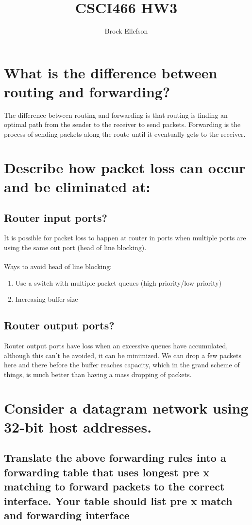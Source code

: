 \documentclass[10pt,letterpaper]{article}
\author{Brock Ellefson}
\title{CSCI466 HW3}
\begin{document}
\maketitle
\section{What is the difference between routing and forwarding?}
The difference between routing and forwarding is that routing is finding an optimal path from the sender to the receiver to send packets. Forwarding is the process of sending packets along the route until it eventually gets to the receiver. 

\section{Describe how packet loss can occur and be eliminated at:}
\subsection{Router input ports?}
It is possible for packet loss to happen at router in ports when multiple ports are using the same out port (head of line blocking).
\\ \\
Ways to avoid head of line blocking:
\begin{enumerate}
  \item Use a switch with multiple packet queues (high priority/low priority) 
  \item Increasing buffer size 
\end{enumerate}

\subsection{Router output ports?}
Router output ports have loss when an excessive queues have  
accumulated, although this can't be avoided, it can be minimized. We can drop a few packets here and there before the buffer reaches capacity, which in the grand scheme of things, is much better than having a mass dropping of packets.


\section{Consider a datagram network using 32-bit host addresses.}
\subsection{Translate  the  above  forwarding  rules  into  a  forwarding  table  that  uses  longest  pre x  matching to  forward  packets  to  the  correct  interface.   Your  table  should  list  pre x  match  and  forwarding interface} 
\end{document}
